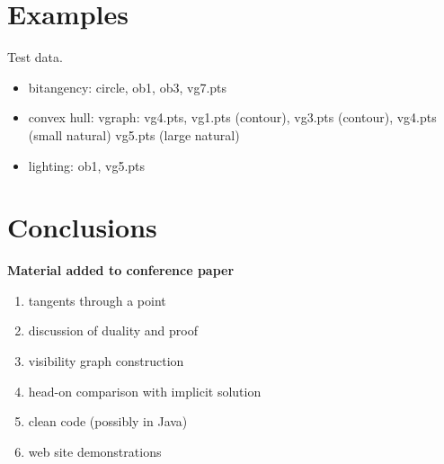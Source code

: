 \documentclass[12pt]{article}
\begin{document}
\section{Examples}

Test data.
\begin{itemize}
\item bitangency: circle, ob1, ob3, vg7.pts
\item convex hull: vgraph: vg4.pts, vg1.pts (contour), vg3.pts (contour), vg4.pts (small natural)
	vg5.pts (large natural)
\item lighting: ob1, vg5.pts
\end{itemize}


\clearpage

\section{Conclusions}

\centerline{{\bf Material added to conference paper}}
\begin{enumerate}
\item tangents through a point
\item discussion of duality and proof
\item visibility graph construction
\item head-on comparison with implicit solution
\item clean code (possibly in Java) 
\item web site demonstrations
\end{enumerate}
\end{document}
